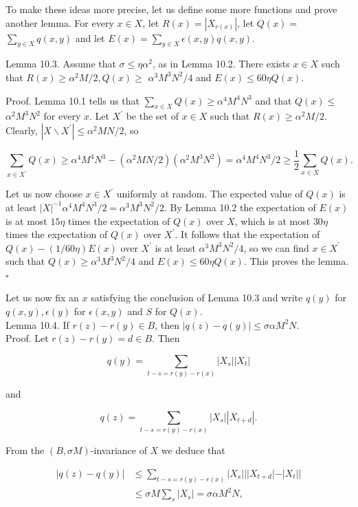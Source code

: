 \documentclass[10pt]{article}
\begin{document}
To make these ideas more precise, let us define some more functions and prove another lemma. For every $x \in X$, let $R(x)=\left|X_{r(x)}\right|$, let $Q(x)=$ $\sum_{y \in X} q(x, y)$ and let $E(x)=\sum_{y \in X} \epsilon(x, y) q(x, y)$.

Lemma 10.3. Assume that $\sigma\leqslant\eta\alpha^2$, as in Lemma 10.2. There exists $x \in X$ such that $R(x) \geqslant \alpha^{2} M / 2, Q(x) \geqslant$ $\alpha^{3} M^{3} N^{2} / 4$ and $E(x) \leqslant 60 \eta Q(x)$.

Proof. Lemma 10.1 tells us that $\sum_{x \in X} Q(x) \geqslant \alpha^{4} M^{4} N^{3}$ and that $Q(x) \leqslant$ $\alpha^{2} M^{3} N^{2}$ for every $x$. Let $X^{\prime}$ be the set of $x \in X$ such that $R(x) \geqslant \alpha^{2} M / 2$. Clearly, $\left|X \backslash X^{\prime}\right| \leqslant \alpha^{2} M N / 2$, so

$$
\sum_{x \in X^{\prime}} Q(x) \geqslant \alpha^{4} M^{4} N^{3}-\left(\alpha^{2} M N / 2\right)\left(\alpha^{2} M^{3} N^{2}\right)=\alpha^{4} M^{4} N^{3} / 2 \geqslant \frac{1}{2} \sum_{x \in X} Q(x) .
$$

Let us now choose $x \in X^{\prime}$ uniformly at random. The expected value of $Q(x)$ is at least $|X|^{-1} \alpha^{4} M^{4} N^{3} / 2=\alpha^{3} M^{3} N^{2} / 2$. By Lemma 10.2 the expectation of $E(x)$ is at most $15 \eta$ times the expectation of $Q(x)$ over $X$, which is at most $30 \eta$ times the expectation of $Q(x)$ over $X^{\prime}$. It follows that the expectation of $Q(x)-(1 / 60 \eta) E(x)$ over $X^{\prime}$ is at least $\alpha^{3} M^{3} N^{2} / 4$, so we can find $x \in X^{\prime}$ such that $Q(x) \geqslant \alpha^{3} M^{3} N^{2} / 4$ and $E(x) \leqslant 60 \eta Q(x)$. This proves the lemma. \(\square\)

Let us now fix an $x$ satisfying the conclusion of Lemma 10.3 and write $q(y)$ for $q(x, y), \epsilon(y)$ for $\epsilon(x, y)$ and $S$ for $Q(x)$.\\
Lemma 10.4. If $r(z)-r(y) \in B$, then $|q(z)-q(y)| \leqslant \sigma \alpha M^{2} N$.\\
Proof. Let $r(z)-r(y)=d \in B$. Then

$$
q(y)=\sum_{t-s=r(y)-r(x)}\left|X_{s}\right|\left|X_{t}\right|
$$

and

$$
q(z)=\sum_{t-s=r(y)-r(x)}\left|X_{s}\right|\left|X_{t+d}\right| .
$$

From the $(B, \sigma M)$-invariance of $X$ we deduce that

$$
\begin{aligned}
|q(z)-q(y)| & \leqslant \sum_{t-s=r(y)-r(x)}\left|X_{s}\right|| | X_{t+d}\left|-\left|X_{t}\right|\right| \\
& \leqslant \sigma M \sum_{s}\left|X_{s}\right|=\sigma \alpha M^{2} N,
\end{aligned}
$$
\end{document}
